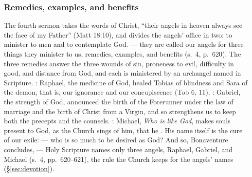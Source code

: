 \subsubsection{Remedies, examples, and benefits}

The fourth sermon takes the words of Christ, ``their angels in heaven always
see the face of my Father'' (Matt 18:10), and divides the angels' office in
two: to minister to men and to contemplate God.  --- they are called our angels for three things they minister to
us, remedies, examples, and benefits (s.~4, p.~620). The three remedies
answer the three wounds of sin, proneness to evil, difficulty in good, and
distance from God, and each is ministered by an archangel named in
Scripture. : Raphael, the medicine of God, healed Tobias of blindness and
Sara of the demon, that is, our ignorance and our concupiscence (Tob 6, 11).
: Gabriel, the strength of God,
announced the birth of the Forerunner under the law of marriage and the
birth of Christ from a Virgin, and so strengthens us to keep both the
precepts and the counsels. : Michael, \emph{Who is like God}, makes souls present to God, as the
Church sings of him, that he . His name itself is the cure of our exile:  --- who is so much to be desired as God? And so,
Bonaventure concludes,  --- Holy Scripture
names only three angels, Raphael, Gabriel, and Michael (s.~4, pp.~620--621),
the rule the Church keeps for the angels' names (\S\ref{sec:devotion}).

